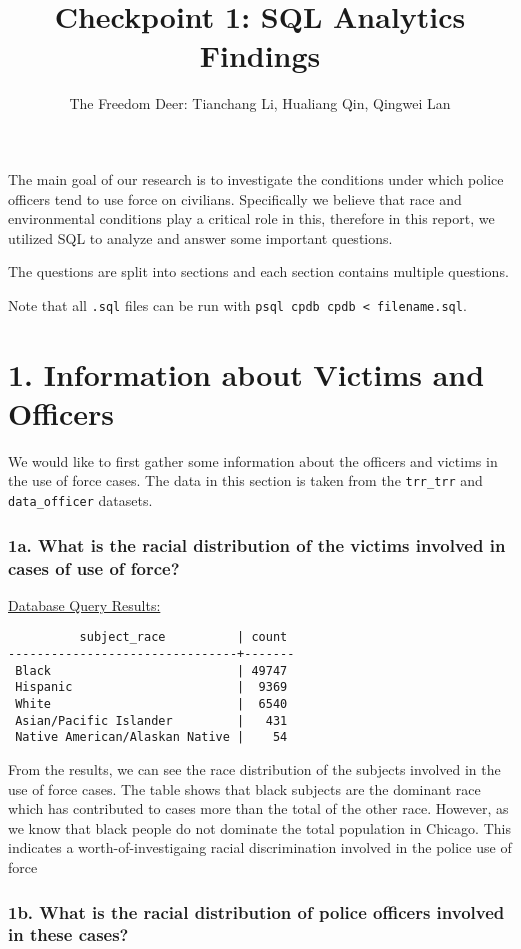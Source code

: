 \documentclass[10pt]{article}
\title{Checkpoint 1: SQL Analytics Findings}
\author{The Freedom Deer: Tianchang Li, Hualiang Qin, Qingwei Lan}
\begin{document}
\maketitle

The main goal of our research is to investigate the conditions under which police officers tend to use force on civilians. Specifically we believe that race and environmental conditions play a critical role in this, therefore in this report, we utilized SQL to analyze and answer some important questions.

The questions are split into sections and each section contains multiple questions.

Note that all \texttt{.sql} files can be run with \texttt{psql cpdb cpdb < filename.sql}.

\section*{1. Information about Victims and Officers}

We would like to first gather some information about the officers and victims in the use of force cases. The data in this section is taken from the \texttt{trr\_trr} and \texttt{data\_officer} datasets.

\subsubsection*{1a. What is the racial distribution of the victims involved in cases of use of force?}

\underline{Database Query Results:}

\begin{verbatim}
          subject_race          | count
--------------------------------+-------
 Black                          | 49747
 Hispanic                       |  9369
 White                          |  6540
 Asian/Pacific Islander         |   431
 Native American/Alaskan Native |    54
\end{verbatim}

From the results, we can see the race distribution of the subjects involved in the use of force cases. The table shows that black subjects are the dominant race which has contributed to cases more than the total of the other race. However, as we know that black people do not dominate the total population in Chicago. This indicates a worth-of-investigaing racial discrimination involved in the police use of force


\subsubsection*{1b. What is the racial distribution of police officers involved in these cases?}
\end{document}
